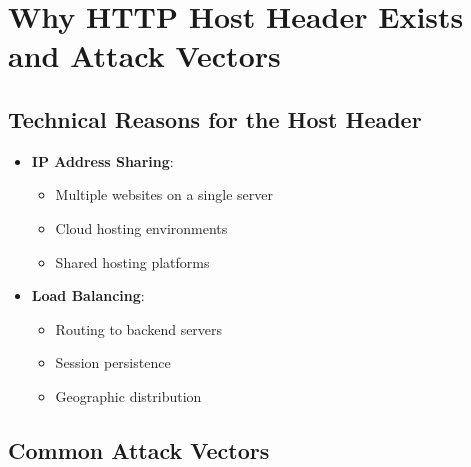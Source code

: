 \documentclass[12pt,a4paper]{article}
\begin{document}
\section{Why HTTP Host Header Exists and Attack Vectors}

\subsection{Technical Reasons for the Host Header}

\begin{itemize}
    \item \textbf{IP Address Sharing}: 
        \begin{itemize}
            \item Multiple websites on a single server
            \item Cloud hosting environments
            \item Shared hosting platforms
        \end{itemize}
    
    \item \textbf{Load Balancing}:
        \begin{itemize}
            \item Routing to backend servers
            \item Session persistence
            \item Geographic distribution
        \end{itemize}
    
\end{itemize}


\subsection{Common Attack Vectors}
\end{document}
